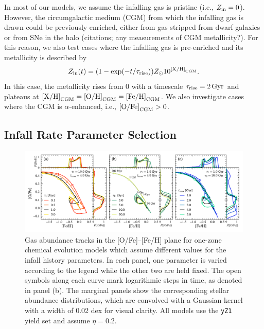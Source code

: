 \documentclass[twocolumn,twocolappendix,linenumbers]{aastex631}
\newcommand{\todo}[1]{{\color{red}#1}}
\begin{document}
In most of our models, we assume the infalling gas is pristine (i.e., $Z_{\rm in}=0$). However, the circumgalactic medium (CGM) from which the infalling gas is drawn could be previously enriched, either from gas stripped from dwarf galaxies or from SNe in the halo \todo{(citations; any measurements of CGM metallicity?)}. For this reason, we also test cases where the infalling gas is pre-enriched and its metallicity is described by
\begin{equation}
    \label{eq:pre-enrichment}
    Z_{\rm in}(t) = (1 - \exp(-t/\tau_{\rm rise})) Z_\odot 10^{{\rm [X/H]}_{\rm CGM}}.
\end{equation}
In this case, the metallicity rises from 0 with a timescale $\tau_{\rm rise}=2\,{\rm Gyr}$ and plateaus at ${\rm [X/H]}_{\rm CGM}={\rm [O/H]}_{\rm CGM}={\rm [Fe/H]}_{\rm CGM}$. We also investigate cases where the CGM is $\alpha$-enhanced, i.e., ${\rm [O/Fe]}_{\rm CGM}>0$.

\subsection{Infall Rate Parameter Selection}
\label{sec:parameter-selection}

\begin{figure}
    \centering
    \includegraphics{figures/onezone_params.pdf}
    \caption{Gas abundance tracks in the [O/Fe]--[Fe/H] plane for one-zone chemical evolution models which assume different values for the infall history parameters. In each panel, one parameter is varied according to the legend while the other two are held fixed. The open symbols along each curve mark logarithmic steps in time, as denoted in panel (b). The marginal panels show the corresponding stellar abundance distributions, which are convolved with a Gaussian kernel with a width of 0.02 dex for visual clarity. All models use the {\tt yZ1} yield set and assume $\eta=0.2$.}
    \label{fig:twoinfall-parameters}
\end{figure}
\end{document}
